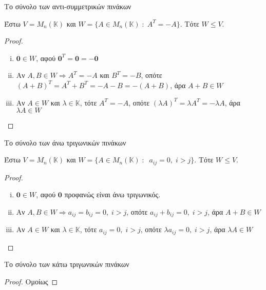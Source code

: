 \begin{example}
    \textcolor{Col2}{Το σύνολο των αντι-συμμετρικών πινάκων}

    Έστω $ V = M_{n}(\mathbb{K}) $ και $ W = \{ A \in M_{n}(\mathbb{K}) \;
    : \; A^{T}=-A \}  $. Τότε $ W \leq V $.
    \begin{proof}
    \item {}
        \begin{enumerate}[i)]
            \item  $ \mathbf{0} \in W $, αφού $ \mathbf{0}^{T}= 
                \mathbf{0} = - \mathbf{0} $
            \item 
                Αν $ A, B \in W \Rightarrow A^{T}=-A $ και $ B^{T}=-B $, οπότε
                $ (A+B)^{T}= A^{T}+B^{T}=-A-B = - (A+B) $, άρα $A+B \in W$
            \item Αν $ A \in W $ και $ \lambda \in \mathbb{K} $, τότε 
                $A^{T}=-A$, οπότε $(\lambda A)^{T} = \lambda A^{T} =
                -\lambda A  $, άρα $ \lambda A \in W $
        \end{enumerate}
    \end{proof}
\end{example}

\begin{example}
    \textcolor{Col2}{Το σύνολο των άνω τριγωνικών πινάκων}

    Έστω $ V = M_{n}(\mathbb{K}) $ και $ W = \{ A \in M_{n}(\mathbb{K}) \;
    : \; \; a_{ij} = 0, \; i>j \}  $. Τότε $ W \leq V $.

    \begin{proof}
    \item {}
        \begin{enumerate}[i)]
            \item  $ \mathbf{0} \in W $, αφού $ \mathbf{0} $ 
                προφανώς είναι άνω τριγωνικός.
            \item  Αν $ A, B \in W \Rightarrow a_{ij} = b_{ij} = 0, 
                \; i>j$, οπότε $a_{ij} + b_{ij} = 0, \; i>j$, άρα $A+B \in W$
            \item Αν $ A \in W $ και $ \lambda \in \mathbb{K} $, τότε 
                $a_{ij} = 0, \; i>j$, οπότε $ \lambda a_{ij} = 0, \; i>j$, 
                άρα $ \lambda A \in W $
        \end{enumerate}
    \end{proof}
\end{example}

\begin{example}
    \textcolor{Col2}{Το σύνολο των κάτω τριγωνικών πινάκων}
    \begin{proof}
        Ομοίως
    \end{proof}
\end{example}

